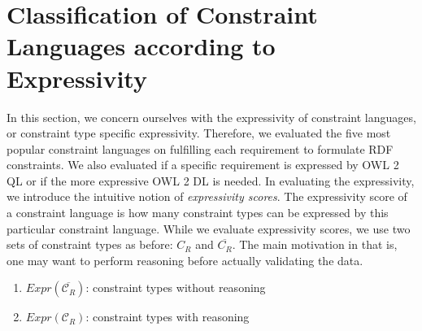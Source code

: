 \documentclass{llncs}
\begin{document}
\section{Classification of Constraint Languages according to Expressivity}
\label{classification-constraint-languages}
 
In this section, we concern ourselves with the expressivity of constraint languages, or constraint type specific expressivity.
Therefore, we evaluated the five most popular constraint languages on fulfilling each requirement to formulate RDF constraints.
We also evaluated if a specific requirement is expressed by OWL 2 QL or if the more expressive OWL 2 DL is needed\cite{BoschNolleAcarEckert2015}.
In evaluating the expressivity,  we introduce the intuitive notion of \emph{expressivity scores}. 
The expressivity score of a constraint language is how many constraint types can be expressed by this particular constraint language.
While we evaluate expressivity scores, we use two sets of constraint types as before: $C_R$ and $\overline{C_R}$. The main motivation in that is, one may want to perform reasoning before actually validating the data. 
\begin{enumerate}
	\item $Expr(\overline{\mathcal{C}_R})$: constraint types without reasoning 
	\item $Expr(\mathcal{C}_R)$: constraint types with reasoning
\end{enumerate}
\end{document}
